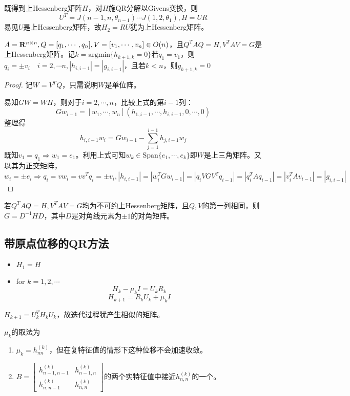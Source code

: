 \documentclass{ctexart}
\begin{document}
既得到上Hessenberg矩阵$H$，对$H$施QR分解以Givens变换，则
\[U^T=J(n-1,n,\theta_{n-1})\cdots J(1,2,\theta_1),H=UR\]
易见$U$是上Hessenberg矩阵，故$H_2=RU$犹为上Hessenberg矩阵。


\begin{Thm}[隐式Q定理]
$A=\mathbf{R}^{n\times n},Q=[q_1,\cdots, q_n],V=[v_1,\cdots,v_n]\in O(n)$，且$Q^TAQ=H,V^TAV=G$是上Hessenberg矩阵。记$k=\mathrm{argmin}\{h_{k+1,k}=0\}$若$q_1=v_1$，则$q_i=\pm v_i\quad i=2,\cdots n, |h_{i,i-1}|=|g_{i,i-1}|$，且若$k<n$，则$g_{k+1,k}=0$
\end{Thm}

\begin{proof}
记$W=V^TQ$，只需说明$W$是单位阵。

易知$GW=WH$，则对于$i=2,\cdots,n$，比较上式的第$i-1$列：
\[Gw_{i-1}=[w_1,\cdots, w_n](h_{1,i-1},\cdots,h_{i,i-1},0,\cdots,0)\]
整理得
\[h_{i,i-1}w_i=Gw_{i-1}-\sum_{j=1}^{i-1}h_{j,i-1}w_j\]
既知$v_1=q_1\Rightarrow w_1=e_1$。利用上式可知$w_k\in\mathrm{Span}\{e_1,\cdots,e_k\}$即$W$是上三角矩阵。又以其为正交矩阵，$w_i=\pm e_i\Rightarrow q_i=vw_i=vv^Tq_i=\pm v_i,|h_{i,i-1}|=|w_i^TGw_{i-1}|=|q_iVGV^Tq_{i-1}|=|q_i^TAq_{i-1}|=|v_i^TAv_{i-1}|=|g_{i,i-1}|$
\end{proof}

\begin{Cor}
若$Q^TAQ=H,V^TAV=G$均为不可约上Hessenberg矩阵，且$Q,V$的第一列相同，则$G=D^{-1}HD$，其中$D$是对角线元素为$\pm 1$的对角矩阵。
\end{Cor}


\subsection{带原点位移的QR方法}
\begin{itemize}
\item $H_1=H$
\item for $k=1,2,\cdots$
\[H_k-\mu_kI=U_kR_k\]
\[H_{k+1}=R_kU_k+\mu_kI\]
\end{itemize}
$H_{k+1}=U_k^TH_kU_k$，故迭代过程犹产生相似的矩阵。

$\mu_k$的取法为
\begin{enumerate}
\item $\mu_k=h^{(k)}_{nn}$，但在复特征值的情形下这种位移不会加速收敛。
\item $B=\begin{bmatrix}h^{(k)}_{n-1,n-1}&h^{(k)}_{n-1,n}\\h^{(k)}_{n,n-1}&h^{(k)}_{n,n}\end{bmatrix}$的两个实特征值中接近$h_{n,n}^{(k)}$的一个。
\end{enumerate}
\end{document}
